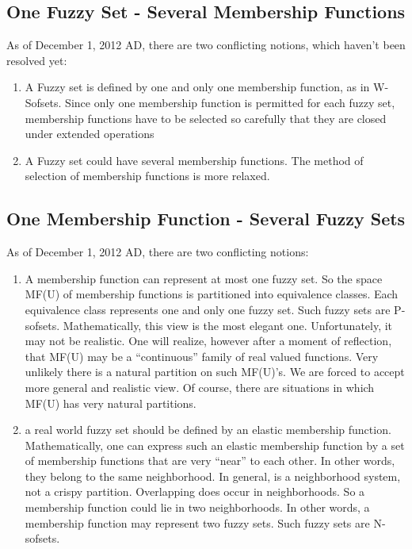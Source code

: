 \documentclass[12pt]{article} %
\begin{document}
\subsection{One Fuzzy Set - Several Membership Functions}
As of December 1, 2012 AD, there are two conflicting notions, which haven't been resolved yet:
\begin{enumerate}
\item{A Fuzzy set is defined by one and only one membership function, as in W-Sofsets. Since only one membership function is permitted for each fuzzy set, membership functions have to be selected so carefully
that they are closed under extended operations}
\item{A Fuzzy set could have several membership functions. The method of selection of membership functions is more relaxed.}
\end{enumerate}

\subsection{One Membership Function - Several Fuzzy Sets}
As of December 1, 2012 AD, there are two conflicting notions:
\begin{enumerate}
\item{A membership function can represent at most
one fuzzy set. So the space MF(U) of membership
functions is partitioned into equivalence classes. Each
equivalence class represents one and only one fuzzy set.
Such fuzzy sets are P-sofsets. Mathematically, this
view is the most elegant one. Unfortunately, it may not
be realistic. One will realize, however after a moment
of reflection, that MF(U) may be a “continuous” family
of real valued functions. Very unlikely there is a natural
partition on such MF(U)’s. We are forced to accept
more general and realistic view. Of course, there are
situations in which MF(U) has very natural partitions.}
\item{a real world fuzzy set should be defined by an elastic
membership function. Mathematically, one can express
such an elastic membership function by a set of
membership functions that are very “near” to each other.
In other words, they belong to the same neighborhood.
In general, is a neighborhood system, not a crispy
partition. Overlapping does occur in neighborhoods. So
a membership function could lie in two neighborhoods.
In other words, a membership function may represent
two fuzzy sets. Such fuzzy sets are N-sofsets.}
\end{enumerate}
\end{document}
